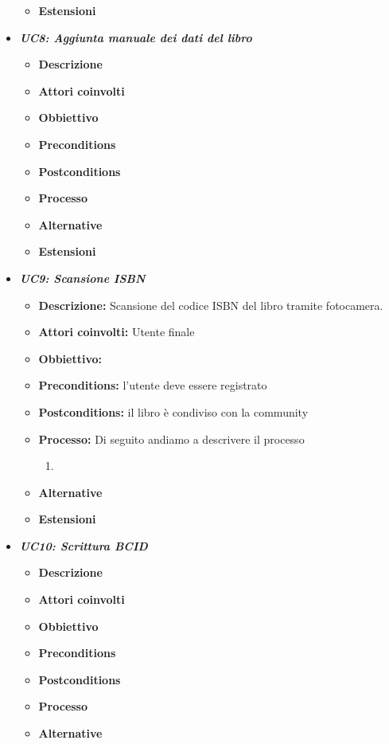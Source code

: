 \begin{itemize}
\begin{itemize}
		\item \textbf{Estensioni}
	\end{itemize}
	\item \textbf{\textit{UC8: Aggiunta manuale dei dati del libro}}
	\begin{itemize}
		\item \textbf{Descrizione}
		\item \textbf{Attori coinvolti}
		\item \textbf{Obbiettivo}
		\item \textbf{Preconditions}
		\item \textbf{Postconditions}
		\item \textbf{Processo}
		\item \textbf{Alternative}
		\item \textbf{Estensioni}
	\end{itemize}
	\item \textbf{\textit{UC9: Scansione ISBN}}
	\begin{itemize}
		\item \textbf{Descrizione:} Scansione del codice ISBN del libro tramite fotocamera.
		\item \textbf{Attori coinvolti:} Utente finale
		\item \textbf{Obbiettivo:}
		\item \textbf{Preconditions:} l'utente deve essere registrato
		\item \textbf{Postconditions:} il libro è condiviso con la community
		\item \textbf{Processo:} Di seguito andiamo a descrivere il processo
		\begin{enumerate}
			\item 
		\end{enumerate}
		\item \textbf{Alternative}
		\item \textbf{Estensioni}
	\end{itemize}
	\item \textbf{\textit{UC10: Scrittura BCID}}
	\begin{itemize}
		\item \textbf{Descrizione}
		\item \textbf{Attori coinvolti}
		\item \textbf{Obbiettivo}
		\item \textbf{Preconditions}
		\item \textbf{Postconditions}
		\item \textbf{Processo}
		\item \textbf{Alternative}

\end{itemize}
\end{itemize}
